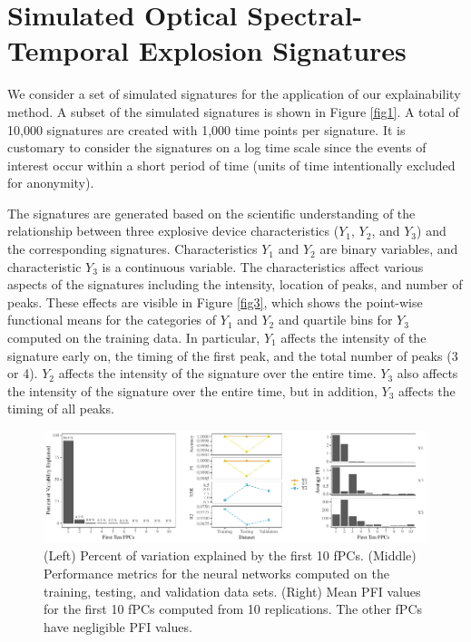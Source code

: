 \documentclass[letterpaper]{article}
\begin{document}
\section{Simulated Optical Spectral-Temporal Explosion Signatures} \label{data}

We consider a set of simulated signatures for the application of our explainability method. A subset of the simulated signatures is shown in Figure \ref{fig1}. A total of 10,000 signatures are created with 1,000 time points per signature. It is customary to consider the signatures on a log time scale since the events of interest occur within a short period of time (units of time intentionally excluded for anonymity).

The signatures are generated based on the scientific understanding of the relationship between three explosive device characteristics (\(Y_1\), \(Y_2\), and \(Y_3\)) and the corresponding signatures. Characteristics \(Y_1\) and \(Y_2\) are binary variables, and characteristic \(Y_3\) is a continuous variable. The characteristics affect various aspects of the signatures including the intensity, location of peaks, and number of peaks. These effects are visible in Figure \ref{fig3}, which shows the point-wise functional means for the categories of \(Y_1\) and \(Y_2\) and quartile bins for \(Y_3\) computed on the training data. In particular, \(Y_1\) affects the intensity of the signature early on, the timing of the first peak, and the total number of peaks (3 or 4). \(Y_2\) affects the intensity of the signature over the entire time. \(Y_3\) also affects the intensity of the signature over the entire time, but in addition, \(Y_3\) affects the timing of all peaks.

\begin{figure}[t]
\centering
\includegraphics[width=1.95\columnwidth]{fig4}
\caption{(Left) Percent of variation explained by the first 10 fPCs. (Middle) Performance metrics for the neural networks computed on the training, testing, and validation data sets. (Right) Mean PFI values for the first 10 fPCs computed from 10 replications. The other fPCs have negligible PFI values.}
\label{fig4}
\end{figure}
\end{document}
